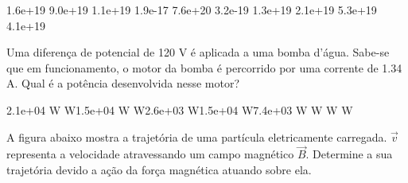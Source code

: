 \documentclass[12pt, addpoints]{exam}
\begin{document}
\begin{questions}
\begin{multicols*}{2}
\begin{oneparchoices}
\choice 1.6e+19 \choice 9.0e+19 \choice 1.1e+19 \choice 1.9e-17 \choice 7.6e+20 \choice 3.2e-19 \choice 1.3e+19 \choice 2.1e+19 \choice 5.3e+19 \choice 4.1e+19 
\end{oneparchoices}\question Uma diferença de potencial de 120 V é aplicada a uma bomba d’água. Sabe-se que em funcionamento, o motor da bomba é percorrido por uma corrente de    1.34 A. Qual é a potência desenvolvida nesse motor?

\begin{oneparchoices}
\choice 2.1e+04 W W\choice 1.5e+04 W W\choice 2.6e+03 W\choice 1.5e+04 W\choice 7.4e+03 W W W W
\end{oneparchoices}\question A ﬁgura abaixo mostra a trajetória de uma partícula eletricamente carregada. $\vec{{v}}$ representa a velocidade atravessando um campo magnético $\vec{{B}}$. Determine a sua trajetória devido a ação da força magnética atuando sobre ela.
        
        \begin{center}
            \begin{minipage}[c]{0.5\linewidth}
            \end{minipage}
        \end{center}

        


\end{multicols*}
\end{questions}
\end{document}
